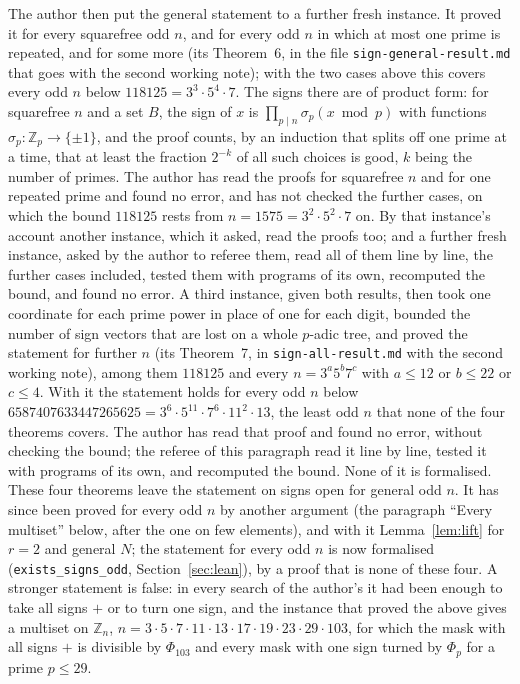 \documentclass[11pt,a4paper]{amsart}
\theoremstyle{definition}
\theoremstyle{remark}
\newcommand{\Z}{\mathbb{Z}}
\newcommand{\lean}[1]{\texttt{#1}}
\begin{document}
The author then put the general statement to a further fresh instance. It proved it for every squarefree odd $n$,
and for every odd $n$ in which at most one prime is repeated, and for some more (its Theorem~6, in the file
\texttt{sign-general-result.md} that goes with the second working note); with the two cases above this covers every
odd $n$ below $118125=3^3\cdot5^4\cdot7$. The signs there are of product form: for squarefree $n$ and a set $B$,
the sign of $x$ is $\prod_{p\mid n}\sigma_p(x\bmod p)$ with functions $\sigma_p\colon\Z_p\to\{\pm1\}$, and the proof
counts, by an induction that splits off one prime at a time, that at least the fraction $2^{-k}$ of all such choices
is good, $k$ being the number of primes. The author has read the proofs for squarefree $n$ and for one repeated prime and found no error, and has not checked the further cases, on which the bound $118125$ rests from $n=1575=3^2\cdot5^2\cdot7$ on. By that instance's account another instance, which it asked, read the proofs too; and a further fresh instance, asked by the author to referee them, read all of them line by line, the further cases included, tested them with programs of its own, recomputed the bound, and found no error. A third instance, given both results, then took one coordinate for each prime power in place of one for each digit, bounded the
number of sign vectors that are lost on a whole $p$-adic tree, and proved the statement for further $n$ (its Theorem~7, in
\texttt{sign-all-result.md} with the second working note), among them $118125$ and every $n=3^a5^b7^c$ with $a\le12$ or $b\le22$
or $c\le4$. With it the statement holds for every odd $n$ below $6587407633447265625=3^6\cdot5^{11}\cdot7^6\cdot11^2\cdot13$, the
least odd $n$ that none of the four theorems covers. The author has read that proof and found no error, without checking the
bound; the referee of this paragraph read it line by line, tested it with programs of its own, and recomputed the bound.
None of it is formalised. These four theorems leave the statement on signs open for general odd $n$. It has since
been proved for every odd $n$ by another argument (the paragraph ``Every multiset'' below, after the one on few elements), and with it
Lemma~\ref{lem:lift} for $r=2$ and general $N$; the statement for every odd $n$ is now formalised
(\lean{exists\_signs\_odd}, Section~\ref{sec:lean}), by a proof that is none of these four. A stronger statement
is false: in every search of the author's it had been enough to take all signs $+$ or to turn one sign, and the instance that proved the above gives a multiset on $\Z_n$, $n=3\cdot5\cdot7\cdot11\cdot13\cdot17\cdot19\cdot23\cdot29\cdot103$, for which the mask
with all signs $+$ is divisible by $\Phi_{103}$ and every mask with one sign turned by $\Phi_p$ for a prime $p\le29$.
\end{document}
